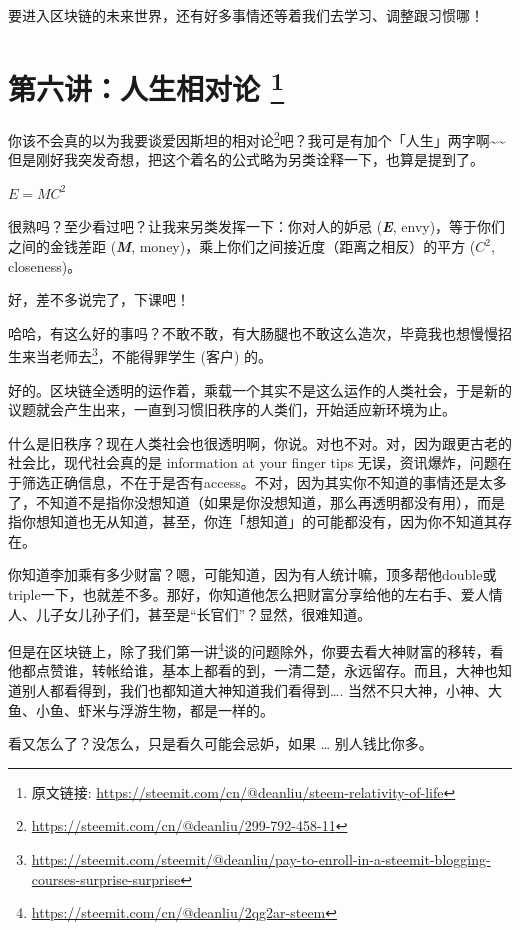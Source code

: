 \documentclass[]{ctexbook}
\renewcommand{\href}[2]{#2\footnote{\url{#1}}}
\begin{document}
要进入区块链的未来世界，还有好多事情还等着我们去学习、调整跟习惯哪！

\hypertarget{deanliu6}{%
\section[第六讲：人生相对论 ]{\texorpdfstring{第六讲：人生相对论 \footnote{原文链接: \url{https://steemit.com/cn/@deanliu/steem-relativity-of-life}}}{第六讲：人生相对论 }}\label{deanliu6}}

你该不会真的以为我要谈\href{https://steemit.com/cn/@deanliu/299-792-458-11}{爱因斯坦的相对论}吧？我可是有加个「人生」两字啊\textasciitilde{}\textasciitilde{} 但是刚好我突发奇想，把这个着名的公式略为另类诠释一下，也算是提到了。

\(E = MC^2\)

很熟吗？至少看过吧？让我来另类发挥一下：你对人的妒忌 (\textbf{\emph{E}}, envy)，等于你们之间的金钱差距 (\textbf{\emph{M}}, money)，乘上你们之间接近度（距离之相反）的平方 (\(C^2\), closeness)。

好，差不多说完了，下课吧！

哈哈，有这么好的事吗？不敢不敢，有大肠腿也不敢这么造次，毕竟我也想慢慢\href{https://steemit.com/steemit/@deanliu/pay-to-enroll-in-a-steemit-blogging-courses-surprise-surprise}{招生来当老师去}，不能得罪学生 (客户) 的。

好的。区块链全透明的运作着，乘载一个其实不是这么运作的人类社会，于是新的议题就会产生出来，一直到习惯旧秩序的人类们，开始适应新环境为止。

什么是旧秩序？现在人类社会也很透明啊，你说。对也不对。对，因为跟更古老的社会比，现代社会真的是 information at your finger tips 无误，资讯爆炸，问题在于筛选正确信息，不在于是否有access。不对，因为其实你不知道的事情还是太多了，不知道不是指你没想知道（如果是你没想知道，那么再透明都没有用），而是指你想知道也无从知道，甚至，你连「想知道」的可能都没有，因为你不知道其存在。

你知道李加乘有多少财富？嗯，可能知道，因为有人统计嘛，顶多帮他double或triple一下，也就差不多。那好，你知道他怎么把财富分享给他的左右手、爱人情人、儿子女儿孙子们，甚至是``长官们''？显然，很难知道。

但是在区块链上，除了我们\href{https://steemit.com/cn/@deanliu/2qg2ar-steem}{第一讲}谈的问题除外，你要去看大神财富的移转，看他都点赞谁，转帐给谁，基本上都看的到，一清二楚，永远留存。而且，大神也知道别人都看得到，我们也都知道大神知道我们看得到\ldots{}. 当然不只大神，小神、大鱼、小鱼、虾米与浮游生物，都是一样的。

看又怎么了？没怎么，只是看久可能会忌妒，如果 \ldots{} 别人钱比你多。
\end{document}
